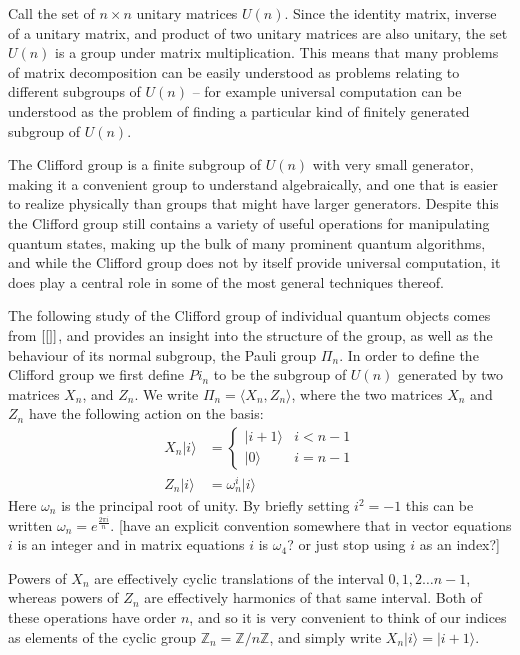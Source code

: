 \documentclass[]{article}
\newcommand{\ket}[1]{| #1 \rangle}
\begin{document}
Call the set of $n\times n$ unitary matrices $U(n)$. Since the identity matrix, inverse of a unitary matrix, and product of two unitary matrices are also unitary, the set $U(n)$ is a group under matrix multiplication. This means that many problems of matrix decomposition can be easily understood as problems relating to different subgroups of $U(n)$ -- for example universal computation can be understood as the problem of finding a particular kind of finitely generated subgroup of $U(n)$.

The Clifford group is a finite subgroup of $U(n)$ with very small generator, making it a convenient group to understand algebraically, and one that is easier to realize physically than groups that might have larger generators. Despite this the Clifford group still contains a variety of useful operations for manipulating quantum states, making up the bulk of many prominent quantum algorithms, and while the Clifford group does not by itself provide universal computation, it does play a central role in some of the most general techniques thereof.

The following study of the Clifford group of individual quantum objects comes from $[\cite]$, and provides an insight into the structure of the group, as well as the behaviour of its normal subgroup, the Pauli group $\Pi_n$. In order to define the Clifford group we first define $Pi_n$ to be the subgroup of $U(n)$ generated by two matrices $X_n$, and $Z_n$. We write $\Pi_n = \langle X_n, Z_n\rangle$, where the two matrices $X_n$ and $Z_n$ have the following action on the basis:
\begin{align*}
X_n\ket{i} &= \begin{cases}\ket{i+1} & i < n-1 \\ \ket{0} & i = n-1\end{cases}
\\Z_n\ket{i} &= \omega_n^i\ket{i}
\end{align*}
Here $\omega_n$ is the principal root of unity. By briefly setting $i^2 = -1$ this can be written $\omega_n = e^{\frac{2\pi i}{n}}$. [have an explicit convention somewhere that in vector equations $i$ is an integer and in matrix equations $i$ is $\omega_4$? or just stop using $i$ as an index?]

Powers of $X_n$ are effectively cyclic translations of the interval $0, 1, 2\dots n-1$, whereas powers of $Z_n$ are effectively harmonics of that same interval. Both of these operations have order $n$, and so it is very convenient to think of our indices as elements of the cyclic group $\mathbb{Z}_n = \mathbb{Z}/n\mathbb{Z}$, and simply write $X_n\ket{i}=\ket{i+1}$.
\end{document}
